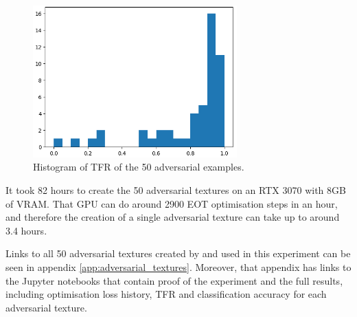 \begin{figure}[ht]
    \centering
    \includegraphics[width=0.7\textwidth]{graphics/eot_histogram.PNG}
    \caption{Histogram of TFR of the 50 adversarial examples.}
    \label{fig:eot_histogram}
\end{figure}

It took 82 hours to create the 50 adversarial textures on an RTX 3070 with 8GB of VRAM. That GPU can do around 2900 EOT optimisation steps in an hour, and therefore the creation of a single adversarial texture can take up to around 3.4 hours.

Links to all 50 adversarial textures created by and used in this experiment can be seen in appendix \ref{app:adversarial_textures}. Moreover, that appendix has links to the Jupyter notebooks that contain proof of the experiment and the full results, including optimisation loss history, TFR and classification accuracy for each adversarial texture.

